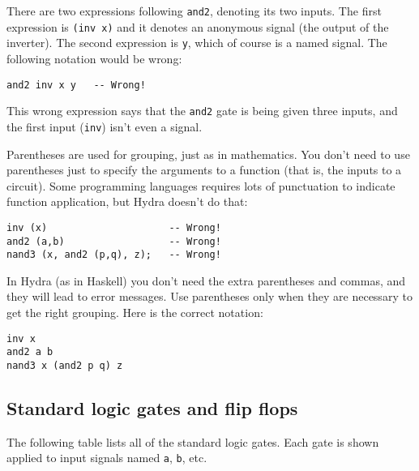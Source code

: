 \documentclass[11pt]{article}
\begin{document}
There are two expressions following \texttt{and2}, denoting its two inputs.
The first expression is \texttt{(inv x)} and it denotes an anonymous signal
(the output of the inverter).  The second expression is \texttt{y}, which of
course is a named signal.  The following notation would be wrong:

\begin{verbatim}
and2 inv x y   -- Wrong!
\end{verbatim}

This wrong expression says that the \texttt{and2} gate is being given three
inputs, and the first input (\texttt{inv}) isn't even a signal.

Parentheses are used for grouping, just as in mathematics.  You don't
need to use parentheses just to specify the arguments to a function
(that is, the inputs to a circuit).  Some programming languages
requires lots of punctuation to indicate function application, but
Hydra doesn't do that:

\begin{verbatim}
inv (x)                     -- Wrong!
and2 (a,b)                  -- Wrong!
nand3 (x, and2 (p,q), z);   -- Wrong!
\end{verbatim}

In Hydra (as in Haskell) you don't need the extra parentheses and
commas, and they will lead to error messages.  Use parentheses only
when they are necessary to get the right grouping.  Here is the
correct notation:

\begin{verbatim}
inv x
and2 a b
nand3 x (and2 p q) z
\end{verbatim}

\subsection{Standard logic gates and flip flops}
\label{sec:orgaf9f1b9}

The following table lists all of the standard logic gates.  Each gate
is shown applied to input signals named \texttt{a}, \texttt{b}, etc.
\end{document}
